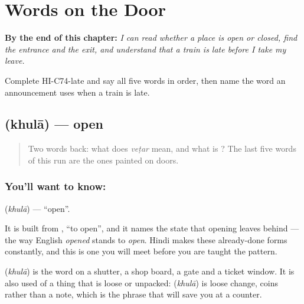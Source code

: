 
\chapter{Words on the Door}
\label{ch:hi-words-on-the-door}

\begin{chapteropening}
\textbf{By the end of this chapter:} \emph{I can read whether a place is open or closed, find the entrance and the exit, and understand that a train is late before I take my leave.}

Complete HI-C74-late and say all five words in order, then name the word an announcement uses when a train is late.
\end{chapteropening}

\section[\texorpdfstring{\hi{खुला} / \hi{खुलना} (khulā / khulnā)}{खुला / खुलना (khulā / khulnā)}]{ (khulā) — open}

\label{lesson:HI-C74-open}



\begin{quote}
Two words back: what does \emph{veṭar} mean, and what is \textbf{}? The last five words of this run are the ones painted on doors.
\end{quote}

\subsection*{You'll want to know: }
\textbf{} (\emph{khulā}) — \textquotedblleft{}open\textquotedblright{}.

It is built from \textbf{}, \textquotedblleft{}to open\textquotedblright{}, and it names the state that opening leaves behind — the way English \emph{opened} stands to \emph{open}. Hindi makes these already-done forms constantly, and this is one you will meet before you are taught the pattern.

\textbf{} (\emph{khulā}) is the word on a shutter, a shop board, a gate and a ticket window. It is also used of a thing that is loose or unpacked: \textbf{} (\emph{khulā})  is loose change, coins rather than a note, which is the phrase that will save you at a counter.

